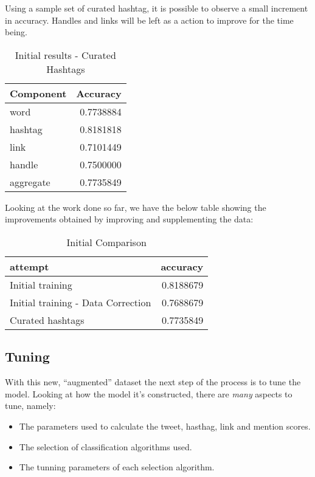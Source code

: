 \documentclass[11pt,]{article}
\providecommand{\tightlist}{%
  \setlength{\itemsep}{0pt}\setlength{\parskip}{0pt}}
\begin{document}
Using a sample set of curated hashtag, it is possible to observe a small
increment in accuracy. Handles and links will be left as a action to
improve for the time being.

\begin{table}[!h]

\caption{\label{tab:fp_acc3}Initial results - Curated Hashtags}
\centering
\begin{tabular}[t]{lr}
\toprule
Component & Accuracy\\
\midrule
\rowcolor{gray!6}  word & 0.7738884\\
hashtag & 0.8181818\\
\rowcolor{gray!6}  link & 0.7101449\\
handle & 0.7500000\\
\rowcolor{gray!6}  aggregate & 0.7735849\\
\bottomrule
\end{tabular}
\end{table}

Looking at the work done so far, we have the below table showing the
improvements obtained by improving and supplementing the data:

\begin{table}[!h]

\caption{\label{tab:results_comparison_1}Initial Comparison}
\centering
\begin{tabular}[t]{lr}
\toprule
attempt & accuracy\\
\midrule
\rowcolor{gray!6}  Initial training & 0.8188679\\
Initial training - Data Correction & 0.7688679\\
\rowcolor{gray!6}  Curated hashtags & 0.7735849\\
\bottomrule
\end{tabular}
\end{table}

\hypertarget{tuning}{%
\subsection{Tuning}\label{tuning}}

With this new, ``augmented'' dataset the next step of the process is to
tune the model. Looking at how the model it's constructed, there are
\emph{many} aspects to tune, namely:

\begin{itemize}
\tightlist
\item
  The parameters used to calculate the tweet, hasthag, link and mention
  scores.
\item
  The selection of classification algorithms used.
\item
  The tunning parameters of each selection algorithm.
\end{itemize}
\end{document}
